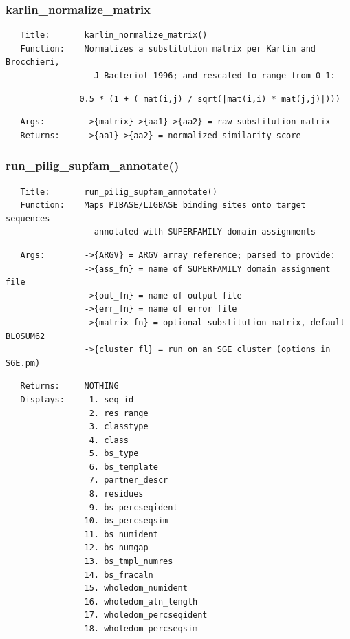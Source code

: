 \documentclass{article}
\begin{document}
\subsubsection*{karlin\_normalize\_matrix\label{pibase::SUPFAM_pm_karlin_normalize_matrix}}
\begin{verbatim}
   Title:       karlin_normalize_matrix()
   Function:    Normalizes a substitution matrix per Karlin and Brocchieri,
                  J Bacteriol 1996; and rescaled to range from 0-1:
\end{verbatim}
\begin{verbatim}
               0.5 * (1 + ( mat(i,j) / sqrt(|mat(i,i) * mat(j,j)|)))
\end{verbatim}
\begin{verbatim}
   Args:        ->{matrix}->{aa1}->{aa2} = raw substitution matrix
   Returns:     ->{aa1}->{aa2} = normalized similarity score
\end{verbatim}
\subsubsection*{run\_pilig\_supfam\_annotate()\label{pibase::SUPFAM_pm_run_pilig_supfam_annotate_}}
\begin{verbatim}
   Title:       run_pilig_supfam_annotate()
   Function:    Maps PIBASE/LIGBASE binding sites onto target sequences
                  annotated with SUPERFAMILY domain assignments
\end{verbatim}
\begin{verbatim}
   Args:        ->{ARGV} = ARGV array reference; parsed to provide:
                ->{ass_fn} = name of SUPERFAMILY domain assignment file
                ->{out_fn} = name of output file
                ->{err_fn} = name of error file
                ->{matrix_fn} = optional substitution matrix, default BLOSUM62
                ->{cluster_fl} = run on an SGE cluster (options in SGE.pm)
\end{verbatim}
\begin{verbatim}
   Returns:     NOTHING
   Displays:     1. seq_id
                 2. res_range
                 3. classtype
                 4. class
                 5. bs_type
                 6. bs_template
                 7. partner_descr
                 8. residues
                 9. bs_percseqident
                10. bs_percseqsim
                11. bs_numident
                12. bs_numgap
                13. bs_tmpl_numres
                14. bs_fracaln
                15. wholedom_numident
                16. wholedom_aln_length
                17. wholedom_percseqident
                18. wholedom_percseqsim
\end{verbatim}
\end{document}
